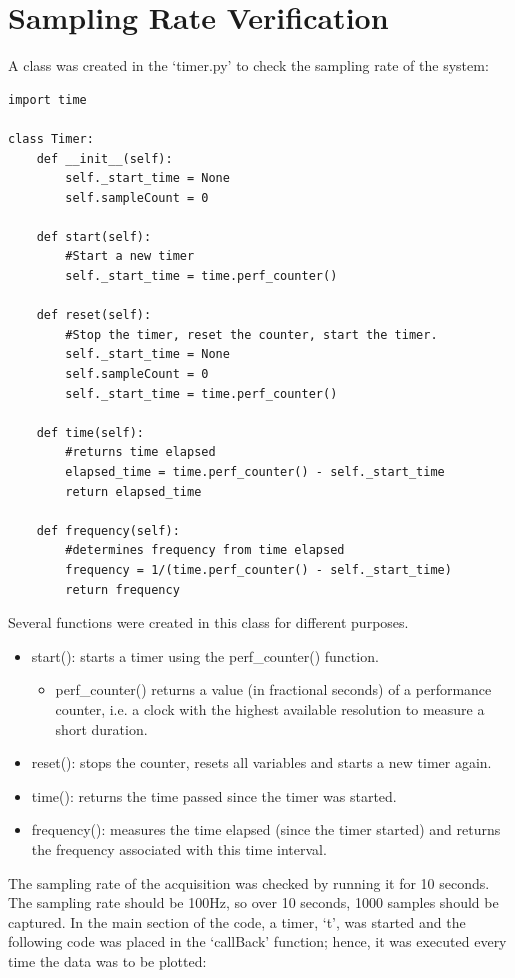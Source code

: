 \documentclass{article}
\begin{document}
\section{Sampling Rate Verification}
A class was created in the `timer.py' to check the sampling rate of the system:
\begin{lstlisting}
import time

class Timer:
    def __init__(self):
        self._start_time = None
        self.sampleCount = 0

    def start(self):
        #Start a new timer
        self._start_time = time.perf_counter()

    def reset(self):
        #Stop the timer, reset the counter, start the timer.
        self._start_time = None
        self.sampleCount = 0
        self._start_time = time.perf_counter()

    def time(self):
        #returns time elapsed
        elapsed_time = time.perf_counter() - self._start_time
        return elapsed_time
    
    def frequency(self):
        #determines frequency from time elapsed
        frequency = 1/(time.perf_counter() - self._start_time)
        return frequency
\end{lstlisting}
Several functions were created in this class for different purposes.
\begin{itemize}
  \item start(): starts a timer using the perf\_counter() function.
  \begin{itemize}
  \item perf\_counter() returns a value (in fractional seconds) of a performance counter, i.e. a clock with the highest available resolution to measure a short duration.
  \end{itemize}  
  \item reset(): stops the counter, resets all variables and starts a new timer again.
  \item time(): returns the time passed since the timer was started.
  \item frequency(): measures the time elapsed (since the timer started) and returns the frequency associated with this time interval.
\end{itemize}
The sampling rate of the acquisition was checked by running it for 10 seconds.\newline
The sampling rate should be 100Hz, so over 10 seconds, 1000 samples should be captured. In the main section of the code, a timer, `t', was started and the following code was placed in the `callBack' function; hence, it was executed every time the data was to be plotted:
\end{document}
